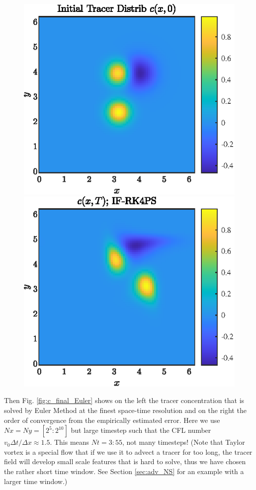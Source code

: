 \documentclass[11pt,letterpaper]{article}
\begin{document}
\begin{figure}[H]
    \centering
    \includegraphics{figs/c_init_IF-RK4PS}
    \includegraphics{figs/c_final_IF-RK4PS}
    \caption{}\label{fig:c_init_IF}
\end{figure}
Then Fig. \ref{fig:c_final_Euler} shows on the left the tracer concentration that is solved by Euler Method at the finest space-time resolution and on the right the order of convergence from the empirically estimated error. Here we use $Nx = Ny= [2^5:2^{10}]$ but large timestep such that the CFL number $v_0\Delta t/\Delta x \approx 1.5$. This means $Nt = 3:55$, not many timesteps! (Note that Taylor vortex is a special flow that if we use it to advect a tracer for too long, the tracer field will develop small scale features that is hard to solve, thus we have chosen the rather short time window. See Section \ref{sec:adv_NS} for an example with a larger time window.)
\end{document}
